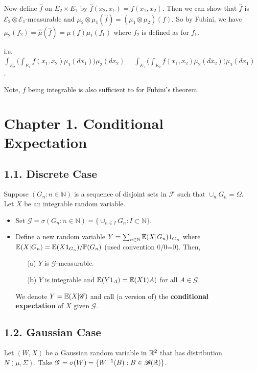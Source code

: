 \documentclass[12pt,a4paper]{report}
\begin{document}
Now define $\hat{f}$ on $E_2 \times E_1$ by $\hat{f}(x_2,x_1) = f(x_1,x_2)$. Then we can show that $\hat{f}$ is $\mathscr{E}_2 \otimes \mathscr{E}_1$-measurable and $\mu_2 \otimes \mu_1 (\hat{f}) = (\mu_1 \otimes \mu_2)(f)$. So by Fubini, we have $\mu_2(f_2) = \hat{\mu}(\hat{f}) = \mu(f) \mu_1(f_1)$ where $f_2$ is defined as for $f_1$.
\s

i.e. $\int_{E_2} \big( \int_{E_1} f(x_1, x_2) \mu_1(dx_1) \big) \mu_2(dx_2) = \int_{E_1} \big( \int_{E_2} f(x_1, x_2) \mu_2(dx_2) \big) \mu_1(dx_1)$.
\s

Note, $f$ being integrable is also sufficient to for Fubini's theorem.
\s

\section*{Chapter 1. Conditional Expectation}
\subsection*{1.1. Discrete Case}

Suppose $(G_n : n\in \mathbb{N})$ is a sequence of disjoint sets in $\mathscr{F}$ such that $\cup_n G_n = \Omega$. Let $X$ be an integrable random variable.
\begin{itemize}
\item Set $\mathscr{G} = \sigma(G_n : n\in \mathbb{N}) = \{ \cup_{n\in I}G_n : I \subset \mathbb{N} \}$.

\item Define a new random variable $Y = \sum_{n \in \mathbb{N}} \mathbb{E}(X | G_n ) 1_{G_n}$ where $\mathbb{E}(X|G_n) =  \mathbb{E}(X 1_{G_n}) / \mathbb{P}(G_n)$ (used convention 0/0=0). Then,
\begin{itemize}
\item[(a)] $Y$ is $\mathscr{G}$-measurable.
\item[(b)] $Y$ is integrable and $\mathbb{E}(Y 1_A) = \mathbb{E}(X 1)A)$ for all $A \in \mathscr{G}$.
\end{itemize} 
We denote $Y = \mathbb{E}(X|\mathscr{G})$ and call (a version of) the \textbf{conditional expectation} of $X$ given $\mathscr{G}$. 
\end{itemize}
\s

\subsection*{1.2. Gaussian Case}

Let $(W,X)$ be a Gaussian random variable in $\mathbb{R}^2$ that has distribution $N(\mu, \Sigma)$. Take $\mathscr{G} = \sigma(W) = \{ W^{-1}(B) : B \in \mathscr{B}(\mathbb{R}) \}$. 
\s
\end{document}
